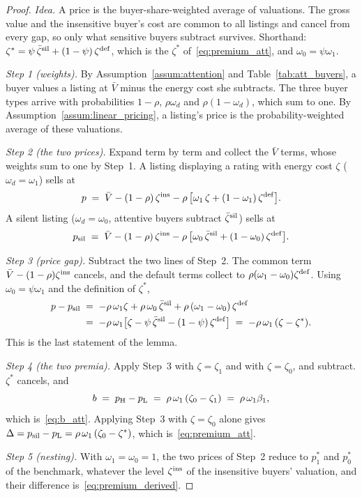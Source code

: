 \begin{proof}\upshape
\emph{Idea.} A price is the buyer-share-weighted average of valuations. The gross value and the insensitive buyer's cost are common to all listings and cancel from every gap, so only what sensitive buyers subtract survives. Shorthand: $\zeta^*=\psi\,\bar \zeta^{\rm sil}+(1-\psi)\,\zeta^{\rm def}$, which is the $\zeta^*$ of~\eqref{eq:premium_att}, and $\omega_0=\psi\omega_1$.

\emph{Step 1 (weights).} By Assumption~\ref{assum:attention} and Table~\ref{tab:att_buyers}, a buyer values a listing at $\bar V$ minus the energy cost she subtracts. The three buyer types arrive with probabilities $1-\rho$, $\rho\omega_d$ and $\rho(1-\omega_d)$, which sum to one. By Assumption~\ref{assum:linear_pricing}, a listing's price is the probability-weighted average of these valuations.

\emph{Step 2 (the two prices).} Expand term by term and collect the $\bar V$ terms, whose weights sum to one by Step~1. A listing displaying a rating with energy cost $\zeta$ ($\omega_d=\omega_1$) sells at
\begin{equation*}
    p\;=\;\bar V-(1-\rho)\,\zeta^{\rm ins}-\rho\,\big[\omega_1\,\zeta+(1-\omega_1)\,\zeta^{\rm def}\big].
\end{equation*}
A silent listing ($\omega_d=\omega_0$, attentive buyers subtract $\bar \zeta^{\rm sil}$) sells at
\begin{equation*}
    p_{\rm sil}\;=\;\bar V-(1-\rho)\,\zeta^{\rm ins}-\rho\,\big[\omega_0\,\bar \zeta^{\rm sil}+(1-\omega_0)\,\zeta^{\rm def}\big].
\end{equation*}

\emph{Step 3 (price gap).} Subtract the two lines of Step~2. The common term $\bar V-(1-\rho)\zeta^{\rm ins}$ cancels, and the default terms collect to $\rho(\omega_1-\omega_0)\zeta^{\rm def}$. Using $\omega_0=\psi\omega_1$ and the definition of $\zeta^*$,
\begin{align*}
    p-p_{\rm sil}
    &\;=\;-\rho\,\omega_1\zeta+\rho\,\omega_0\,\bar \zeta^{\rm sil}+\rho\,(\omega_1-\omega_0)\,\zeta^{\rm def}\\
    &\;=\;-\rho\,\omega_1\big[\zeta-\psi\,\bar \zeta^{\rm sil}-(1-\psi)\,\zeta^{\rm def}\big]\;=\;-\rho\,\omega_1\,(\zeta-\zeta^*).
\end{align*}
This is the last statement of the lemma.

\emph{Step 4 (the two premia).} Apply Step~3 with $\zeta=\zeta_1$ and with $\zeta=\zeta_0$, and subtract. $\zeta^*$ cancels, and
\begin{equation*}
    b\;=\;p_{\rm H}-p_{\rm L}\;=\;\rho\,\omega_1\,(\zeta_0-\zeta_1)\;=\;\rho\,\omega_1\beta_1,
\end{equation*}
which is~\eqref{eq:b_att}. Applying Step~3 with $\zeta=\zeta_0$ alone gives $\Delta=p_{\rm sil}-p_{\rm L}=\rho\,\omega_1\,(\zeta_0-\zeta^*)$, which is~\eqref{eq:premium_att}.

\emph{Step 5 (nesting).} With $\omega_1=\omega_0=1$, the two prices of Step~2 reduce to $p_1^*$ and $p_0^*$ of the benchmark, whatever the level $\zeta^{\rm ins}$ of the insensitive buyers' valuation, and their difference is~\eqref{eq:premium_derived}.
\end{proof}


